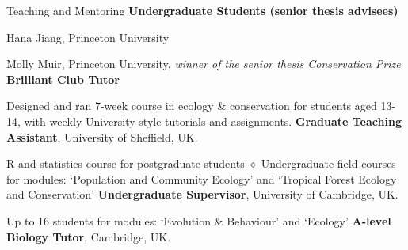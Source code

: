 \begin{rubric}{Teaching and Mentoring}
 \textbf{Undergraduate Students (senior thesis advisees)}
\par Hana Jiang, Princeton University
\par Molly Muir, Princeton University, \emph{winner of the senior thesis Conservation Prize}
\entry*[2017 -- 2018] \textbf{Brilliant Club Tutor}
\par Designed and ran 7-week course in ecology \& conservation for students aged 13-14, with weekly University-style tutorials and assignments.
\entry*[2014 -- 2018] \textbf{Graduate Teaching Assistant}, University of Sheffield, UK.
\par R and statistics course for postgraduate students $\diamond$ Undergraduate field courses for modules: `Population and Community Ecology' and `Tropical Forest Ecology and Conservation'
%
\entry*[2013 -- 2014] \textbf{Undergraduate Supervisor}, University of Cambridge, UK.
\par Up to 16 students for modules: `Evolution \& Behaviour' and  `Ecology'
\entry*[2013 -- 2014] \textbf{A-level Biology Tutor}, Cambridge, UK.

\end{rubric}